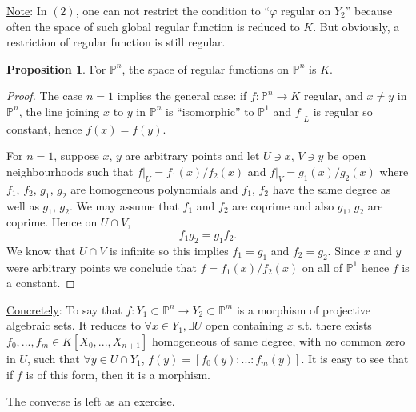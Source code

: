 \documentclass[11pt]{article}
\theoremstyle{definition}
\newtheorem{prop}[thm]{Proposition}
\newcommand{\proj}{\mathbb P}
\newcommand{\lrta}{\longrightarrow}
\begin{document}
\underline{Note}: In $(2)$, one can not restrict the condition to ``$\varphi$ regular on $Y_2$'' because often the space of such global regular function is reduced to $K$. But obviously, a restriction of regular function is still regular.
\begin{prop}
For $\proj^n$, the space of regular functions on $\proj^n$ is $K$.
\end{prop}
\begin{proof}
The case $n=1$ implies the general case: if $f:\proj^n\lrta K$ regular, and $x\neq y$ in $\proj^n$, the line joining $x$ to $y$ in $\proj^n$ is ``isomorphic'' to $\proj^1$ and $f|_L$ is regular so constant, hence $f(x)=f(y)$.

For $n=1$, suppose $x$, $y$ are arbitrary points and let $U \ni x$, $V\ni y$ be open neighbourhoods such that $f|_U =f_1(x)/f_2(x)$ and $f|_V = g_1(x)/g_2(x)$ where $f_1$, $f_2$, $g_1$, $g_2$ are homogeneous polynomials and $f_1$, $f_2$ have the same degree as well as $g_1$, $g_2$. We may assume that $f_1$ and $f_2$ are coprime and also $g_1$, $g_2$ are coprime. Hence on $U \cap V$,
$$
f_1 g_2 = g_1 f_2.
$$
We know that $U \cap V$ is infinite so this implies $f_1 = g_1$ and $ f_2 = g_2$. Since $x$ and $y$ were arbitrary points we conclude that $f = f_1(x)/f_2(x)$ on all of $\proj^1$ hence $f$ is a constant.
\end{proof}
\underline{Concretely}: To say that $f: Y_1\subset \proj^n\lrta Y_2\subset \proj^m$  is a morphism of projective algebraic sets. It reduces to 
$\forall x\in Y_1,\exists U$ open containing $x$ s.t. there exists $f_0,...,f_m\in K[X_0,...,X_{n+1}]$
homogeneous of same degree, with no common zero in $U$, such that
$\forall y\in U\cap Y_1$, $f(y)=[f_0(y):...:f_m(y)]$. It is easy to see that if $f$ is of this form, then it is a morphism.

The converse is left as an exercise.
\end{document}
